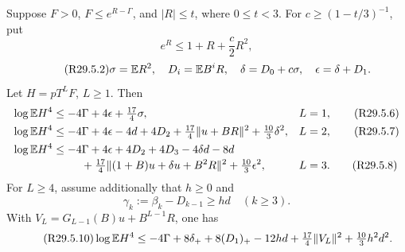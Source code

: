 \begin{lemma}\label{lem:oc:fourth}
Suppose \(F>0\), \(F\le e^{R-\Gamma}\), and \(|R|\le t\), where \(0\le t<3\).
For \(c\ge(1-t/3)^{-1}\), put
\begin{equation}\tag{R29.5.1}\label{eq:oc:remainder}
 e^R\le1+R+\frac c2R^2,
\end{equation}
\begin{equation}\tag{R29.5.2}\label{eq:oc:fourth-data}
 \sigma=\mathbb E R^2,\quad D_i=\mathbb E B^iR,\quad
 \delta=D_0+c\sigma,\quad \epsilon=\delta+D_1.
\end{equation}
Let \(H=pT^LF\), \(L\ge1\). Then
\begin{align}
 \log\mathbb E H^4&\le-4\Gamma+4\epsilon+\tfrac{17}{4}\sigma,
 &&L=1,\tag{R29.5.6}\label{eq:oc:fourth-L1}\\
 \log\mathbb E H^4&\le-4\Gamma+4\epsilon-4d+4D_2
  +\tfrac{17}{4}\|u+BR\|^2+\tfrac{10}{3}\delta^2,
 &&L=2,\tag{R29.5.7}\label{eq:oc:fourth-L2}\\
 \log\mathbb E H^4&\le-4\Gamma+4\epsilon+4D_2+4D_3-4\delta d-8d
  \notag\\[-2pt]
 &\hspace{9mm}+\tfrac{17}{4}\|(1+B)u+\delta u+B^2R\|^2
     +\tfrac{10}{3}\epsilon^2,
 &&L=3.\tag{R29.5.8}\label{eq:oc:fourth-L3}
\end{align}
For \(L\ge4\), assume additionally that \(h\ge0\) and
\begin{equation}\tag{R29.5.9}\label{eq:oc:gamma}
 \gamma_k:=\beta_k-D_{k-1}\ge hd\quad(k\ge3).
\end{equation}
With \(V_L=G_{L-1}(B)u+B^{L-1}R\), one has
\begin{equation}\tag{R29.5.10}\label{eq:oc:fourth-long}
 \log\mathbb E H^4\le-4\Gamma+8\delta_++8(D_1)_+-12hd
          +\tfrac{17}{4}\|V_L\|^2+\tfrac{10}{3}h^2d^2.
\end{equation}
\end{lemma}
